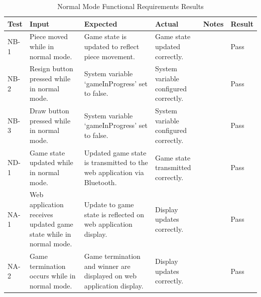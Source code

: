 \documentclass[12pt, titlepage]{article}
\begin{document}
\begin{table}[H]
    \centering
        \setlength{\leftmargini}{0.4cm}
        \begin{tabular}{| >{\centering\arraybackslash}m{1cm} | 
            >{\centering\arraybackslash}m{2.5cm} | 
            >{\centering\arraybackslash}m{4cm} | 
            >{\centering\arraybackslash}m{3cm} |
            >{\centering\arraybackslash}m{3cm} |
            >{\centering\arraybackslash}m{1.5cm} |}
        \hline
        \rowcolor[gray]{0.9}
        Test & Input & Expected & Actual & Notes & Result\\
        \hline
        NB-1 & Piece moved while in normal mode. & Game state is updated to reflect piece movement. & Game state updated correctly. &  & Pass \\
        \hline
        NB-2 & Resign button pressed while in normal mode. & System variable `gameInProgress' set to false. & System variable configured correctly. &  & Pass \\
        \hline
        NB-3 & Draw button pressed while in normal mode. & System variable `gameInProgress' set to false. & System variable configured correctly. &  & Pass \\
        \hline
        ND-1 & Game state updated while in normal mode. & Updated game state is transmitted to the web application via Bluetooth. & Game state transmitted correctly. &  & Pass \\
        \hline
        NA-1 & Web application receives updated game state while in normal mode. & Update to game state is reflected on web application display. & Display updates correctly. &  & Pass \\
        \hline
        NA-2 & Game termination occurs while in normal mode. & Game termination and winner are displayed on web application display. & Display updates correctly. &  & Pass \\
        \hline
        \end{tabular}
    \caption{Normal Mode Functional Requirements Results}
\end{table}

\pagebreak
\end{document}

